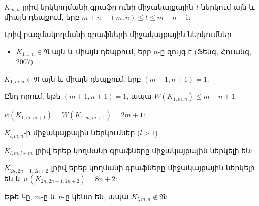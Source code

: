 \begin{hide}
\begin{theorem}[Քամալյան, 1989]
$K_{m,n}$ լրիվ երկկողմանի գրաֆը ունի միջակայքային $t$-ներկում այն և միայն դեպքում, երբ $m+n-(m,n) \leq t \leq m+n-1$:
\end{theorem}
\end{hide}

\begin{frame}{Լրիվ բազմակողմանի գրաֆների միջակայքային ներկումներ}

\begin{itemize}
\item $K_{1,1,n}\in \mathfrak{N}$ այն և միայն դեպքում, երբ $n$-ը զույգ է (Ֆենգ, Հուանգ, 2007)
\end{itemize}

\begin{theorem}[1.5.5]
$K_{1,m,n}\in\mathfrak{N}$ այն և միայն դեպքում, երբ $(m+1,n+1)=1$:

Ընդ որում, եթե $(m+1,n+1)=1$, ապա $W(K_{1,m,n}) \leq m+n+1$:
\end{theorem}

\begin{theorem}[1.5.9]
$w(K_{1,m,m+1}) = W(K_{1,m,m+1}) = 2m+1$:
\end{theorem}
\end{frame}

\begin{frame}{$K_{l,m,n}$-ի միջակայքային ներկումներ ($l > 1$)}

\begin{theorem}[1.5.10]
$K_{l,m,l+m}$ լրիվ երեք կողմանի գրաֆները միջակայքային ներկելի են:
\end{theorem}

\begin{theorem}[1.5.11]
$K_{2n, 2n+1, 2n+2}$ լրիվ երեք կողմանի գրաֆները միջակայքային ներկելի են և $w(K_{2n, 2n+1, 2n+2})=8n+2$:
\end{theorem}

\begin{theorem}[1.5.12]
Եթե $l$-ը, $m$-ը և $n$-ը կենտ են, ապա $K_{l,m,n} \notin \mathfrak{N}$:
\end{theorem}

\end{frame}

